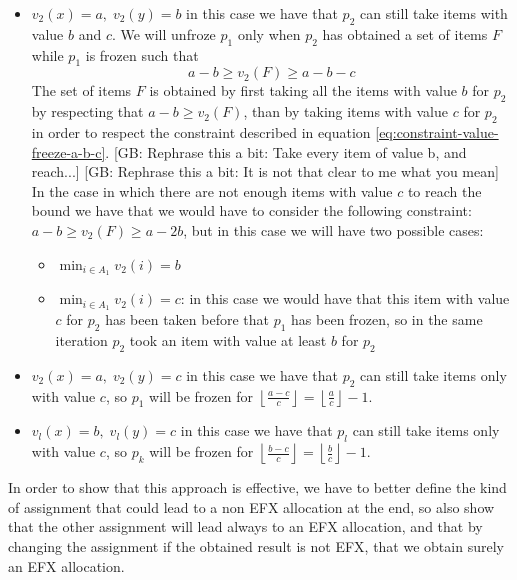 \documentclass{article}
\newcommand{\gb}[1]{{\color{red}[GB: #1]}}
\begin{document}
\begin{itemize}
    \item $v_2(x) = a,\; v_2(y) =  b$ in this case we have that $p_2$ can still take items with value $b$ and $c$. We will unfroze $p_1$ only when $p_2$ has obtained a set of items $F$ while $p_1$ is frozen such that
    \begin{equation}
        a-b\ge v_2(F)\ge a-b-c
        \label{eq:constraint-value-freeze-a-b-c}
    \end{equation}
    The set of items $F$ is obtained by first taking all the items with value $b$ for $p_2$ by respecting that $a-b\ge v_2(F)$, than by taking items with value $c$ for $p_2$ in order to respect the constraint described in equation \ref{eq:constraint-value-freeze-a-b-c}.
    \gb{Rephrase this a bit: Take every item of value b, and reach...}
    \gb{Rephrase this a bit: It is not that clear to me what you mean}
    In the case in which there are not enough items with value $c$ to reach the bound we have that we would have to consider the following constraint: $ a-b\ge v_2(F)\ge a-2b$, but in this case we will have two possible cases:
    \begin{itemize}
        \item $\min_{i\in A_1} v_2(i) = b$ 
        \item $\min_{i\in A_1} v_2(i) = c$: in this case we would have that this item with value $c$ for $p_2$ has been taken before that $p_1$ has been frozen, so in the same iteration $p_2$ took an item with value at least $b$ for $p_2$
    \end{itemize}
    \item $v_2(x) = a,\; v_2(y) =  c$ in this case we have that $p_2$ can still take items only with value $c$, so $p_1$ will be frozen for $\left\lfloor \frac{a-c}{c}\right \rfloor =\left \lfloor \frac{a}{c}\right \rfloor - 1$.
    \item $v_l(x) = b,\; v_l(y) =  c$ in this case we have that $p_l$ can still take items only with value $c$, so $p_k$ will be frozen for $\left \lfloor \frac{b-c}{c}\right \rfloor =\left  \lfloor \frac{b}{c}\right \rfloor - 1$.
\end{itemize}
In order to show that this approach is effective, we have to better define the kind of assignment that could lead to a non EFX allocation at the end, so also show that the other assignment will lead always to an EFX allocation, and that by changing the assignment if the obtained result is not EFX, that we obtain surely an EFX allocation.
\end{document}
